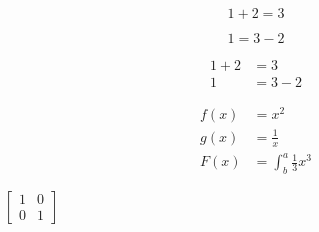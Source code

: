 \documentclass{article}
\begin{document}
	\begin{equation*}
	1 + 2 = 3
	\end{equation*}
	
	\begin{equation*}
	1 = 3 - 2
	\end{equation*}
	
	\begin{align*}
	1 + 2 &= 3\\
	1 &= 3 - 2
	\end{align*}
	
	\begin{align*}
	f(x) &= x^2\\
	g(x) &= \frac{1}{x}\\
	F(x) &= \int^a_b \frac{1}{3}x^3
	\end{align*}
		
	$\left[
	\begin{matrix}
		1 & 0\\
		0 & 1
	\end{matrix}
	\right]$
\end{document}
